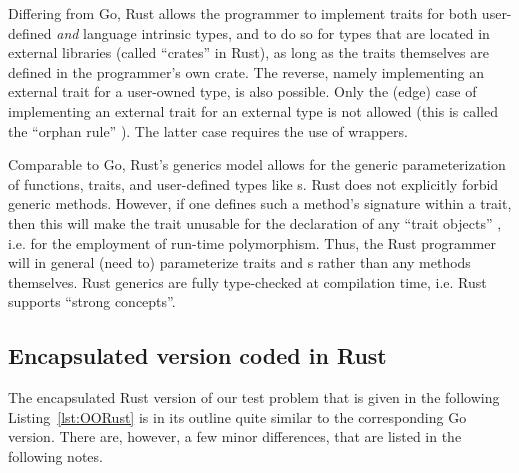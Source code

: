 \documentclass[11pt,oneside]{report}
\newcommand{\code}[1]{{\selectfont\ttfamily{#1}}}
\begin{document}
Differing from Go, Rust allows the programmer to implement traits for
both user-defined \emph{and} language intrinsic types, and to do so
for types that are located in external libraries (called ``crates'' in
Rust), as long as the traits themselves are defined in the
programmer's own crate. The reverse, namely implementing an external
trait for a user-owned type, is also possible. Only the (edge) case of
implementing an external trait for an external type is not allowed
(this is called the ``orphan rule'' \cite{Klabnik_Nichols}). The
latter case requires the use of wrappers.

Comparable to Go, Rust's generics model allows for the generic
parameterization of functions, traits, and user-defined types like
\code{struct}s. Rust does not explicitly forbid generic
methods. However, if one defines such a method's signature within a
trait, then this will make the trait unusable for the declaration of
any ``trait objects'' \cite{Lyon}, i.e. for the employment of run-time
polymorphism. Thus, the Rust programmer will in general (need to)
parameterize traits and \code{struct}s rather than any methods
themselves. Rust generics are fully type-checked at compilation time,
i.e. Rust supports ``strong concepts''.

\subsection{Encapsulated version coded in Rust}

The encapsulated Rust version of our test problem that is given in the
following Listing~\ref{lst:OORust} is in its outline quite similar to
the corresponding Go version. There are, however, a few minor
differences, that are listed in the following notes.
\end{document}
